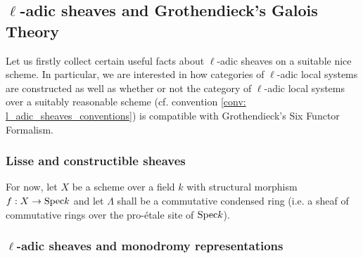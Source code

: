     \subsection{\texorpdfstring{$\ell$}{}-adic sheaves and Grothendieck's Galois Theory}
        Let us firstly collect certain useful facts about $\ell$-adic sheaves on a suitable nice scheme. In particular, we are interested in how categories of $\ell$-adic local systems are constructed as well as whether or not the category of $\ell$-adic local systems over a suitably reasonable scheme (cf. convention \ref{conv: l_adic_sheaves_conventions}) is compatible with Grothendieck's Six Functor Formalism.
        
        \subsubsection{Lisse and constructible sheaves}
            \begin{convention} \label{conv: condensed_coefficient_ring_for_adic_sheaves}
                For now, let $X$ be a scheme over a field $k$ with structural morphism $f: X \to \mathrm{Spec} k$ and let $\Lambda$ shall be a commutative condensed ring (i.e. a sheaf of commutative rings over the pro-\'etale site of $\mathrm{Spec} k$). 
            \end{convention}
        
        \subsubsection{\texorpdfstring{$\ell$}{}-adic sheaves and monodromy representations}